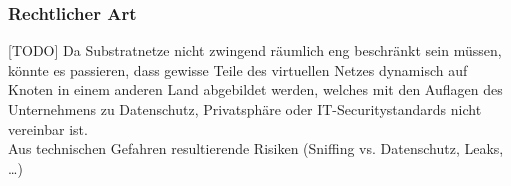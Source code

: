 \subsubsection{Rechtlicher Art}
\label{subsubsec:gefahren_virt_rechtlich}
[TODO]
Da Substratnetze nicht zwingend räumlich eng beschränkt sein müssen, könnte es passieren, dass gewisse Teile des virtuellen Netzes dynamisch auf Knoten in einem anderen Land abgebildet werden, welches mit den Auflagen des Unternehmens zu Datenschutz, Privatsphäre oder IT-Securitystandards nicht vereinbar ist. \\
Aus technischen Gefahren resultierende Risiken (Sniffing vs. Datenschutz, Leaks, …)
